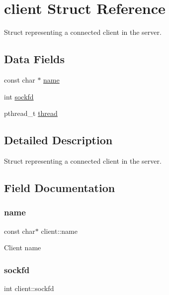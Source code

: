 \hypertarget{structclient}{}\section{client Struct Reference}
\label{structclient}


Struct representing a connected client in the server.  


\subsection*{Data Fields}
\begin{DoxyCompactItemize}
\item 
const char $\ast$ \hyperlink{structclient_a99f435ea140a038c3be5e2ab49aa43aa}{name}
\item 
int \hyperlink{structclient_ab7c05dd7a1a5daa5383849d8b3b0ce3f}{sockfd}
\item 
pthread\+\_\+t \hyperlink{structclient_a529fa20e309347262616a00ad0ad3d93}{thread}
\end{DoxyCompactItemize}


\subsection{Detailed Description}
Struct representing a connected client in the server. 

\subsection{Field Documentation}
\mbox{\label{structclient_a99f435ea140a038c3be5e2ab49aa43aa}} 
\subsubsection{\texorpdfstring{name}{name}}
{\footnotesize\ttfamily const char$\ast$ client\+::name}

Client name \mbox{\label{structclient_ab7c05dd7a1a5daa5383849d8b3b0ce3f}} 
\subsubsection{\texorpdfstring{sockfd}{sockfd}}
{\footnotesize\ttfamily int client\+::sockfd}

